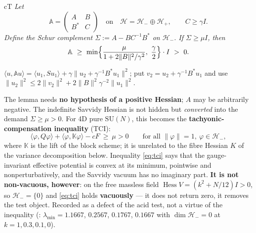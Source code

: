 \begin{claimbox}{cT}
 \emph{Let}
\begin{equation}
\mathbb{A}=\begin{pmatrix} A & B\\ B^* & C\end{pmatrix}
\quad\text{on}\quad \mathcal{H}=\mathcal{H}_-\oplus\mathcal{H}_+,
\qquad C\ge\gamma I .
\label{eq:twoblock}
\end{equation}
\emph{Define the Schur complement $\Sigma:=A-BC^{-1}B^*$ on $\mathcal{H}_-$. If $\Sigma\ge\mu I$,
then}
\begin{equation}
\mathbb{A}\ \ge\ \min\Bigl\{\frac{\mu}{1+2\|B\|^2/\gamma^2},\ \frac{\gamma}{2}\Bigr\}\cdot I
\ >\ 0 .
\label{eq:twoblock-bound}
\end{equation}
\end{claimbox}
\begin{proofx}
$\langle u,\mathbb{A}u\rangle=\langle u_1,Su_1\rangle+\gamma\|u_2+\gamma^{-1}B^*u_1\|^2$; put
$v_2=u_2+\gamma^{-1}B^*u_1$ and use
$\|u_2\|^2\le2\|v_2\|^2+2\|B\|^2\gamma^{-2}\|u_1\|^2$.
\end{proofx}

The lemma needs \textbf{no hypothesis of a positive Hessian}; $A$ may be arbitrarily negative.
The indefinite Savvidy Hessian is not hidden but \emph{converted} into the demand $\Sigma\ge\mu>0$.
For 4D pure $\mathrm{SU}(N)$, this becomes the \textbf{tachyonic-compensation inequality} (TCI):
\begin{equation}
\langle\varphi,Q\varphi\rangle+\langle\varphi,\mathbb{K}\varphi\rangle-cF\ \ge\ \mu>0
\qquad\text{for all }\|\varphi\|=1,\ \varphi\in\mathcal{H}_- ,
\label{eq:tci}
\end{equation}
where $\mathbb{K}$ is the lift of the block scheme; it is unrelated to the fibre Hessian $K$ of
the variance decomposition below. Inequality \eqref{eq:tci} says that the gauge-invariant
effective potential is convex at its minimum, pointwise and nonperturbatively, and the Savvidy
vacuum has no imaginary part. \textbf{It is not non-vacuous, however}: on the free massless field
$\operatorname{Hess}V=(k^2+N/12)I>0$, so $\mathcal{H}_-=\{0\}$ and \eqref{eq:tci} holds
\textbf{vacuously} --- it does not return zero, it removes the test object. Recorded as a defect of
the acid test, not a virtue of the inequality (: $\lambda_{\min}=1.1667$,
$0.2567$, $0.1767$, $0.1667$ with $\dim\mathcal{H}_-=0$ at $k=1,0.3,0.1,0$). \LN{}

